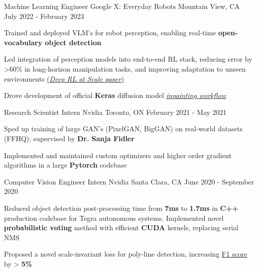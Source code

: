 \begin{cventries}
  \cventry
    {Machine Learning Engineer} %
    {Google X: Everyday Robots} %
    {Mountain View, CA} %
    {July 2022 - February 2023} %
    {
      \begin{cvitems} %
        \item {Trained and deployed VLM's for robot perception, enabling real-time \textbf{open-vocabulary object detection}}
        \item {Led integration of perception models into end-to-end RL stack, reducing error by >60\% in long-horizon manipulation tasks, and improving adaptation to unseen environments \href{https://rl-at-scale.github.io/}{(\underline{\textit{Deep RL at Scale paper}})}}
        \item {Drove development of official \textbf{Keras} diffusion model \href{https://github.com/keras-team/keras-cv/pull/973}{\underline{\textit{inpainting workflow}}}}
      \end{cvitems}
    }

  \cventry
    {Research Scientist Intern} %
    {Nvidia} %
    {Toronto, ON} %
    {February 2021 - May 2021} %
    {
      \begin{cvitems} %
        \item {Sped up training of large GAN's (PixelGAN, BigGAN) on real-world datasets (FFHQ); supervised by \textbf{Dr. Sanja Fidler}}
        \item {Implemented and maintained custom optimizers and higher order gradient algorithms in a large \textbf{Pytorch} codebase}
      \end{cvitems}
    }
  
  \cventry
    {Computer Vision Engineer Intern} %
    {Nvidia} %
    {Santa Clara, CA} %
    {June 2020 - September 2020} %
    {
      \begin{cvitems} %
        \item {Reduced object detection post-processing time from \textbf{7ms}
        to \textbf{1.7ms} in \textbf{C++} production codebase for Tegra
        autonomous systems. Implemented novel \textbf{probabilistic voting}
        method with efficient \textbf{CUDA} kernels, replacing serial NMS}
        \item {Proposed a novel scale-invariant loss for poly-line detection, increasing \underline{F1 score} by > \textbf{5\%}}
      \end{cvitems}
    }


\end{cventries}
